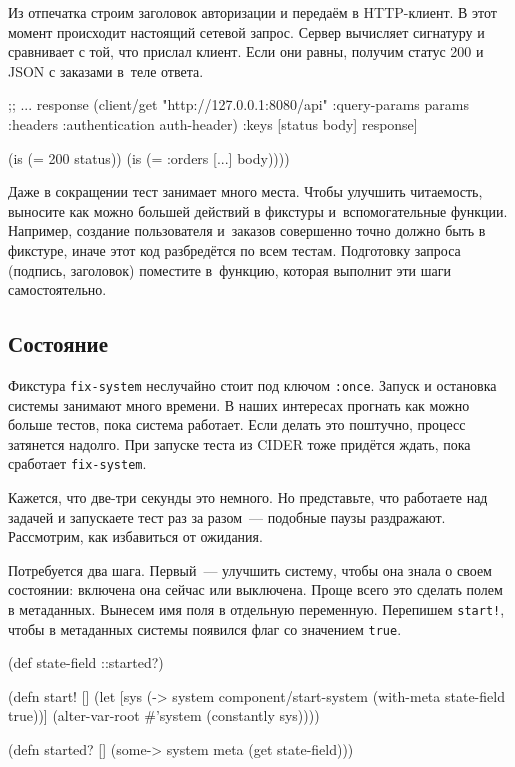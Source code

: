 Из отпечатка строим заголовок авторизации и передаём в HTTP-клиент. В этот
момент происходит настоящий сетевой запрос. Сервер вычисляет сигнатуру и
сравнивает с той, что прислал клиент. Если они равны, получим статус 200 и JSON
с заказами в~теле ответа.

\begin{english}
  \begin{clojure}
        ;; ...
        response (client/get "http://127.0.0.1:8080/api"
                   {:query-params params
                    :headers {:authentication auth-header}})
        {:keys [status body]} response]

    (is (= 200 status))
    (is (= {:orders [...]} body))))
  \end{clojure}
\end{english}

Даже в сокращении тест занимает много места. Чтобы улучшить читаемость, выносите
как можно большей действий в фикстуры и~вспомогательные функции. Например,
создание пользователя и~заказов совершенно точно должно быть в фикстуре, иначе
этот код разбредётся по всем тестам. Подготовку запроса (подпись, заголовок)
поместите в~функцию, которая выполнит эти шаги самостоятельно.

\subsection{Состояние}

Фикстура \verb|fix-system| неслучайно стоит под ключом \verb|:once|. Запуск
и остановка системы занимают много времени. В наших интересах прогнать как можно
больше тестов, пока система работает. Если делать это поштучно, процесс
затянется надолго. При запуске теста из CIDER тоже придётся ждать, пока
сработает \verb|fix-system|.

Кажется, что две-три секунды это немного. Но представьте, что работаете над
задачей и запускаете тест раз за разом~--- подобные паузы
раздражают. Рассмотрим, как избавиться от ожидания.


Потребуется два шага. Первый~--- улучшить систему, чтобы она знала о своем
состоянии: включена она сейчас или выключена. Проще всего это сделать полем в
метаданных. Вынесем имя поля в отдельную переменную. Перепишем \verb|start!|,
чтобы в метаданных системы появился флаг со значением \verb|true|.

\begin{english}
  \begin{clojure}
(def state-field ::started?)

(defn start! []
  (let [sys (-> system
                component/start-system
                (with-meta {state-field true}))]
    (alter-var-root #'system (constantly sys))))

(defn started? []
  (some-> system meta (get state-field)))
  \end{clojure}
\end{english}


